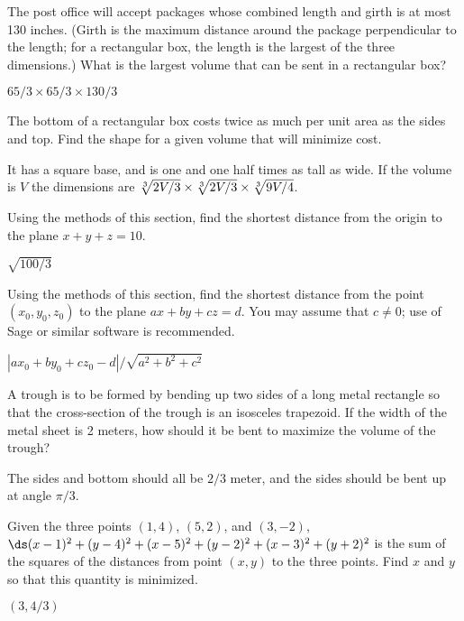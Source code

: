 \begin{enumialphparenastyle}
\begin{ex}
The post office will accept packages whose combined length
and girth is at most 130 inches. (Girth is the maximum distance around
the package perpendicular to the length; for a rectangular box, the
length is the largest of the three dimensions.) What is the largest volume
that can be sent in a rectangular box?
\begin{sol}
$65/3\times 65/3\times 130/3$
\end{sol}
\end{ex}

\begin{ex}
The bottom of a rectangular box costs twice as much per unit
area as the sides and top. Find the shape for a given volume that will
minimize cost.
\begin{sol}
It has a square base, and is one and one half times as tall as wide.
If the volume is $V$ the dimensions are $\root 3 \of {2V/3}\times
\root 3 \of {2V/3}\times \root 3\of {9V/4}$.
\end{sol}
\end{ex}

\begin{ex}
Using the methods of this section, find the shortest
distance from the origin to the plane $x+y+z=10$.
\begin{sol}
$\sqrt{100/3}$
\end{sol}
\end{ex}

\begin{ex}
Using the methods of this section, find the shortest
distance from the point $(x_0,y_0,z_0)$ to the plane $ax+by+cz=d$.
You may assume that $c\not=0$; use of Sage or similar software
is recommended.
\begin{sol}
$|ax_0+by_0+cz_0-d|/\sqrt{a^2+b^2+c^2}$
\end{sol}
\end{ex}

\begin{ex}
A trough is to be formed by bending up two sides of a long
metal rectangle
so that the cross-section of the trough is an isosceles trapezoid.
If the width of the metal sheet is 2
meters, how should it be bent to maximize the volume of the trough?
\begin{sol}
The sides and bottom should all be $2/3$ meter, and the sides
should be bent up at angle $\pi/3$.
\end{sol}
\end{ex}

\begin{ex}
Given the three points $(1,4)$, $(5,2)$, and $(3,-2)$, 
$\ds(x-1)^2+(y-4)^2+(x-5)^2+(y-2)^2+(x-3)^2+(y+2)^2$
is the sum of the squares of the distances from point $(x,y)$ to the
three points. Find $x$ and $y$ so that this quantity is minimized.
\begin{sol}
$(3,4/3)$
\end{sol}
\end{ex}


\end{enumialphparenastyle}
